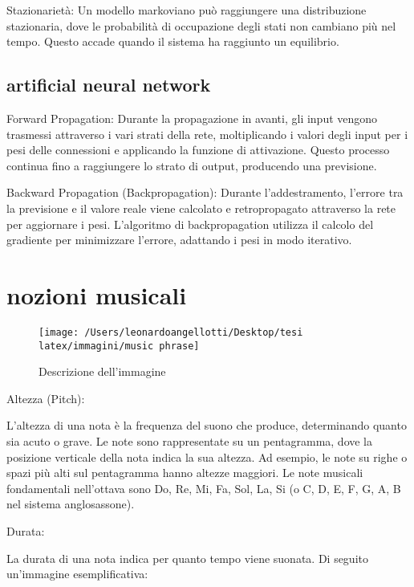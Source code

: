 \documentclass[a4paper,12pt]{report}
\begin{document}
Stazionarietà: Un modello markoviano può raggiungere una distribuzione stazionaria, dove le probabilità di occupazione degli stati non cambiano più nel tempo. Questo accade quando il sistema ha raggiunto un equilibrio.

\subsection{artificial neural network}

Forward Propagation: Durante la propagazione in avanti, gli input vengono trasmessi attraverso i vari strati della rete, moltiplicando i valori degli input per i pesi delle connessioni e applicando la funzione di attivazione. Questo processo continua fino a raggiungere lo strato di output, producendo una previsione.

Backward Propagation (Backpropagation): Durante l'addestramento, l'errore tra la previsione e il valore reale viene calcolato e retropropagato attraverso la rete per aggiornare i pesi. L'algoritmo di backpropagation utilizza il calcolo del gradiente per minimizzare l'errore, adattando i pesi in modo iterativo.

\section{nozioni musicali}

\begin{figure}[h!]
    \centering
    \texttt{[image: /Users/leonardoangellotti/Desktop/tesi latex/immagini/music phrase]} 
    \caption{Descrizione dell'immagine}
    \label{fig:immagine}
\end{figure}


Altezza (Pitch):

L'altezza di una nota è la frequenza del suono che produce, determinando quanto sia acuto o grave.
Le note sono rappresentate su un pentagramma, dove la posizione verticale della nota indica la sua altezza. 
Ad esempio, le note su righe o spazi più alti sul pentagramma hanno altezze maggiori.
Le note musicali fondamentali nell'ottava sono Do, Re, Mi, Fa, Sol, La, Si (o C, D, E, F, G, A, B nel sistema anglosassone).

Durata:

La durata di una nota indica per quanto tempo viene suonata. Di seguito un'immagine esemplificativa:
\end{document}
